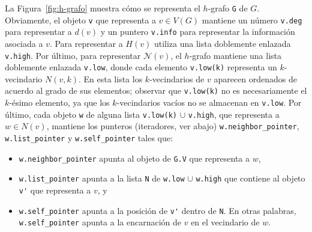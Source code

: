 \documentclass[%
    a4paper,%
    fontsize=12pt,%
    DIV=12,
    twoside,%
    openright,%
    titlepage=true,%
    headsepline,%
    toc=bibliography,%
    parskip=half,%
    cleardoublepage=empty,%
    headings=big,%
]{scrbook}
\makeatletter
\newcommand{\Code}[2][]{\lstinline[basicstyle={\ttfamily},#1]@#2@}
\newcommand{\N}{\mathcal{N}}
\makeatother
\begin{document}
La Figura~\ref{fig:h-grafo} muestra cómo se representa el $h$-grafo \Code{G} de $G$.  Obviamente, el objeto \Code{v} que representa a $v \in V(G)$ mantiene un número \Code{v.deg} para representar a $d(v)$ y un puntero \Code{v.info} para representar la información asociada a $v$. Para representar a $H(v)$ utiliza una lista doblemente enlazada \Code{v.high}.  Por último, para representar $\N(v)$, el $h$-grafo mantiene una lista doblemente enlazada \Code{v.low}, donde cada elemento \Code{v.low(k)} representa un $k$-vecindario $N(v,k)$.  En esta lista los $k$-vecindarios de $v$ aparecen ordenados de acuerdo al grado de sus elementos; observar que \Code{v.low(k)} no es necesariamente el $k$-ésimo elemento, ya que los $k$-vecindarios vacíos no se almacenan en \Code{v.low}.  Por último, cada objeto \Code{w} de alguna lista \Code{v.low(k)} $\cup$ \Code{v.high}, que representa a $w \in N(v)$, mantiene los punteros (iteradores, ver abajo) \Code{w.neighbor_pointer}, \Code{w.list_pointer} y \Code{w.self_pointer} tales que:
\begin{itemize}
  \item \Code{w.neighbor_pointer} apunta al objeto de \Code{G.V} que representa a $w$,
  \item \Code{w.list_pointer} apunta a la lista \Code{N} de \Code{w.low} $\cup$ \Code{w.high} que contiene al objeto \Code{v'} que representa a $v$, y
  \item \Code{w.self_pointer} apunta a la posición de \Code{v'} dentro de \Code{N}.  En otras palabras, \Code{w.self_pointer} apunta a la encarnación de $v$ en el vecindario de $w$.
\end{itemize}

\newcommand{\caja}[1]{\fbox{\!\scriptsize#1\!}}
\newcommand{\VV}[3]{v_{#1}\caja{#2}=\left\{\parbox{13cm}{\ensuremath{#3}}\right.}
\newcommand{\NNN}[1]{\mathcal{N}=\left\{\parbox{11.5cm}{\ensuremath{#1}}\right.}
\newcommand{\NNNEmpty}{\mathcal{N}=\emptyset}
\newcommand{\neigh}[5]{#1\caja{#2}: \mathtt{s}=#3, \mathtt{l}=#4, \mathtt{n}=#5}
\newcommand{\NN}[3]{\mathtt{N}(#1)\caja{#2}=[#3]}
\newcommand{\NH}[2]{\mathtt{H}\caja{#1}=[#2]}
\end{document}
